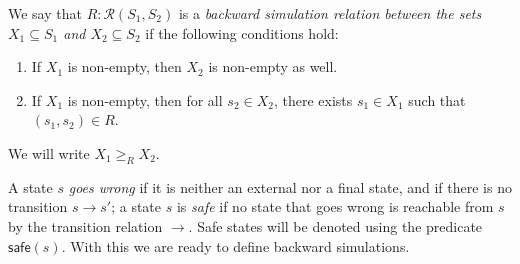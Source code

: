 \documentclass[acmsmall,timestamp,review,anonymous]{acmart}
\newcommand{\kw}[1]{\ensuremath{ \mathsf{#1} }}
\begin{document}
\begin{definition}
We say that $R : \mathcal{R}(S_1, S_2)$ is a
\emph{backward simulation relation
  between the sets $X_1 \subseteq S_1$ and  $X_2 \subseteq S_2$}
if the following conditions hold:
\begin{enumerate}
\item
  If $X_1$ is non-empty,
  then $X_2$ is non-empty as well.
\item
  If $X_1$ is non-empty,
  then for all $s_2 \in X_2$,
  there exists $s_1 \in X_1$
  such that $(s_1, s_2) \in R$.
\end{enumerate}
We will write $X_1 \ge_R X_2$.
\end{definition}

A state $s$ \emph{goes wrong}
if it is neither an external nor a final state,
and if there is no transition $s \rightarrow s'$;
a state $s$ is \emph{safe}
if no state that goes wrong is reachable from $s$
by the transition relation $\rightarrow$.
Safe states will be denoted using the predicate $\kw{safe}(s)$.
With this we are ready to define backward simulations.
\end{document}
